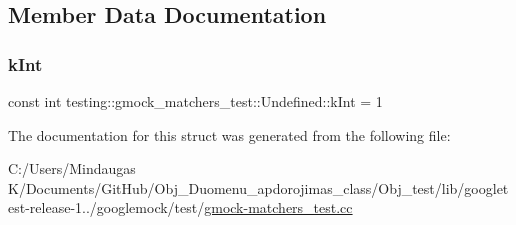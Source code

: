 \subsection{Member Data Documentation}
\mbox{\label{structtesting_1_1gmock__matchers__test_1_1_undefined_a59bddeb8647abbf50ee51b8ca8f0989b}} 
\subsubsection{\texorpdfstring{kInt}{kInt}}
{\footnotesize\ttfamily const int testing\+::gmock\+\_\+matchers\+\_\+test\+::\+Undefined\+::k\+Int = 1\hspace{0.3cm}{\ttfamily [static]}}



The documentation for this struct was generated from the following file\+:\begin{DoxyCompactItemize}
\item 
C\+:/\+Users/\+Mindaugas K/\+Documents/\+Git\+Hub/\+Obj\+\_\+\+Duomenu\+\_\+apdorojimas\+\_\+class/\+Obj\+\_\+test/lib/googletest-\/release-\/1../googlemock/test/\mbox{\hyperlink{_obj__test_2lib_2googletest-release-1_88_81_2googlemock_2test_2gmock-matchers__test_8cc}{gmock-\/matchers\+\_\+test.\+cc}}\end{DoxyCompactItemize}
